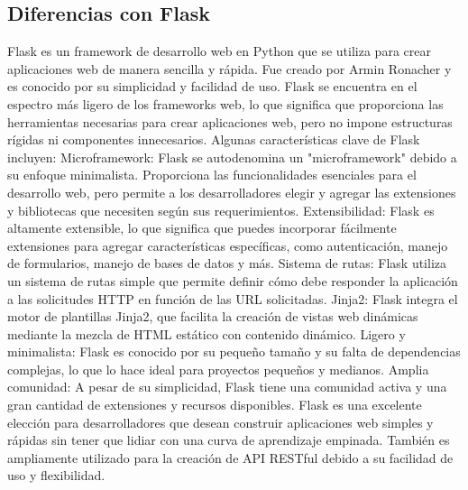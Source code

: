 \subsection{Diferencias con Flask}
Flask es un framework de desarrollo web en Python que se utiliza para crear aplicaciones web de manera sencilla y rápida. Fue creado por Armin Ronacher y es conocido por su simplicidad y facilidad de uso. Flask se encuentra en el espectro más ligero de los frameworks web, lo que significa que proporciona las herramientas necesarias para crear aplicaciones web, pero no impone estructuras rígidas ni componentes innecesarios.
Algunas características clave de Flask incluyen:
Microframework: Flask se autodenomina un "microframework" debido a su enfoque minimalista. Proporciona las funcionalidades esenciales para el desarrollo web, pero permite a los desarrolladores elegir y agregar las extensiones y bibliotecas que necesiten según sus requerimientos.
Extensibilidad: Flask es altamente extensible, lo que significa que puedes incorporar fácilmente extensiones para agregar características específicas, como autenticación, manejo de formularios, manejo de bases de datos y más.
Sistema de rutas: Flask utiliza un sistema de rutas simple que permite definir cómo debe responder la aplicación a las solicitudes HTTP en función de las URL solicitadas.
Jinja2: Flask integra el motor de plantillas Jinja2, que facilita la creación de vistas web dinámicas mediante la mezcla de HTML estático con contenido dinámico.
Ligero y minimalista: Flask es conocido por su pequeño tamaño y su falta de dependencias complejas, lo que lo hace ideal para proyectos pequeños y medianos.
Amplia comunidad: A pesar de su simplicidad, Flask tiene una comunidad activa y una gran cantidad de extensiones y recursos disponibles.
Flask es una excelente elección para desarrolladores que desean construir aplicaciones web simples y rápidas sin tener que lidiar con una curva de aprendizaje empinada. También es ampliamente utilizado para la creación de API RESTful debido a su facilidad de uso y flexibilidad.

